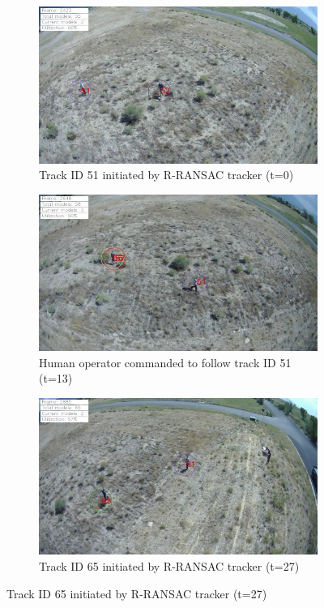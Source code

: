 \documentclass[letterpaper, 10 pt, conference]{ieeeconf}  %
\begin{document}
\newlength{\scalefactor}
\setlength{\scalefactor}{0.85\columnwidth}
\begin{figure}[!htbp]
	\begin{subfigure}{\columnwidth}
		\centering
		\includegraphics[width=\scalefactor]{ID51_track_begin.png}
		\caption{Track ID 51 initiated by R-RANSAC tracker (t=0)}
		\label{camera1}
	\end{subfigure}

	\begin{subfigure}{\columnwidth}
		\centering
		\includegraphics[width=\scalefactor]{ID51_follow_begin.png}
		\caption{Human operator commanded to follow track ID 51 (t=13)}
		\label{camera2}
	\end{subfigure}
	
	\begin{subfigure}{\columnwidth}
		\centering
		\includegraphics[width=\scalefactor]{ID65_track_begin.png}
		\caption{Track ID 65 initiated by R-RANSAC tracker (t=27)}
		\label{camera3}
	\end{subfigure}
	

\end{figure}
\end{document}
